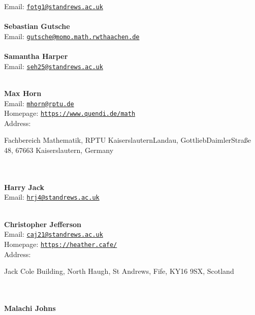 \documentclass[a4paper,11pt]{report}
\begin{document}
\begin{titlepage}
{{  }  Email: \href{mailto://fotg1@st-andrews.ac.uk} {\texttt{fotg1@st\texttt{}andrews.ac.uk}}}\\
{\mbox{}\\
\small \noindent \textbf{ Sebastian Gutsche\\
  }  Email: \href{mailto://gutsche@momo.math.rwth-aachen.de} {\texttt{gutsche@momo.math.rwth\texttt{}aachen.de}}}\\
{\mbox{}\\
\small \noindent \textbf{ Samantha Harper\\
  }  Email: \href{mailto://seh25@st-andrews.ac.uk} {\texttt{seh25@st\texttt{}andrews.ac.uk}}}\\
{\mbox{}\\
\small \noindent \textbf{ Max Horn\\
    }  Email: \href{mailto://mhorn@rptu.de} {\texttt{mhorn@rptu.de}}\\
  Homepage: \href{https://www.quendi.de/math} {\texttt{https://www.quendi.de/math}}\\
  Address: \begin{minipage}[t]{8cm}\noindent
 Fachbereich Mathematik, RPTU Kaiserslautern\texttt{}Landau,
Gottlieb\texttt{}Daimler\texttt{}Stra{\ss}e 48, 67663
Kaiserslautern, Germany\\
 \end{minipage}
}\\
{\mbox{}\\
\small \noindent \textbf{ Harry Jack\\
  }  Email: \href{mailto://hrj4@st-andrews.ac.uk} {\texttt{hrj4@st\texttt{}andrews.ac.uk}}}\\
{\mbox{}\\
\small \noindent \textbf{ Christopher Jefferson\\
    }  Email: \href{mailto://caj21@st-andrews.ac.uk} {\texttt{caj21@st\texttt{}andrews.ac.uk}}\\
  Homepage: \href{https://heather.cafe/} {\texttt{https://heather.cafe/}}\\
  Address: \begin{minipage}[t]{8cm}\noindent
 Jack Cole Building, North Haugh, St Andrews, Fife, KY16 9SX, Scotland\\
 \end{minipage}
}\\
{\mbox{}\\
\small \noindent \textbf{ Malachi Johns\\
}}
\end{titlepage}
\end{document}
